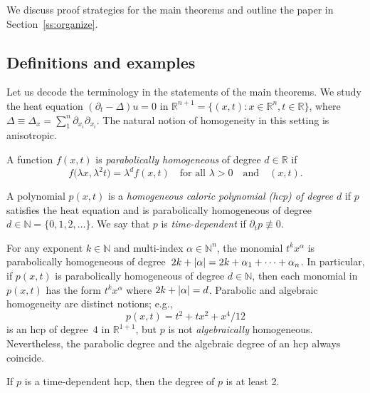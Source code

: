 \documentclass[AHL,Unicode,longabstracts,published]{cedram}
\newcommand{\N}{\mathbb{N}}
\newcommand{\R}{\mathbb{R}}
\newcommand{\abs}[1]{\left \lvert #1 \right \rvert}
\let\originalleft\left
\let\originalright\right
\renewcommand{\left}{\mathopen{}\mathclose\bgroup\originalleft}
\renewcommand{\right}{\aftergroup\egroup\originalright}
\newcommand{\R}{\mathbb{R}}
\begin{document}
We discuss proof strategies for the main theorems and outline the paper in Section~\ref{ss:organize}.

\subsection{Definitions and examples}\label{ss:defs}

Let us decode the terminology in the statements of the main theorems. We study the heat equation $(\partial_t - \Delta) u = 0$ in $\R^{n+1} = \{ (x,t) : x \in \R^n, t \in \R \}$, where $\Delta\equiv \Delta_x=\sum_1^n \partial_{x_i}\partial_{x_i}$. The natural notion of homogeneity in this setting is anisotropic.

\begin{defi}
A function $f(x,t)$ is \emph{parabolically homogeneous} of degree $d \in \R $ if
\begin{equation}
f\bigl(\lambda x, \lambda^2 t\bigr) = \lambda^d f(x,t)\quad\text{for all }\lambda > 0\quad\text{and}\quad(x,t).
\end{equation}
\end{defi}

\begin{defi}
A polynomial $p(x,t)$ is a \emph{homogeneous caloric polynomial (hcp) of degree $d$} if $p$ satisfies the heat equation and is parabolically homogeneous{} of degree $d \in \N=\{0,1,2,\dots\}$. We say that $p$ is \emph{time-dependent} if $\partial_t p \not\equiv 0$.
\end{defi}

\begin{exam}\label{eg:hcp}
For any exponent $k\in \N$ and multi-index $\alpha\in\N^n$, the monomial $t^k x^\alpha$ is parabolically homogeneous{} of degree~$2k + \abs{\alpha}=2k+\alpha_1+\dots+\alpha_n$. In particular, if $p(x,t)$ is parabolically homogeneous{} of degree $d \in \N$, then each monomial in $p(x,t)$ has the form $t^k x^\alpha$ where $2k + \abs{\alpha} = d$. Parabolic and algebraic homogeneity are distinct notions; e.g.,
\begin{equation}
p(x,t)= t^2 +tx^2 + x^4/12
\end{equation}
is an hcp of degree~$4$ in $\R^{1+1}$, but $p$ is not \emph{algebraically} homogeneous. Nevertheless, the parabolic degree and the algebraic degree of an hcp always coincide.
\end{exam}

\begin{rema}
If $p$ is a time-dependent hcp, then the degree of $p$ is at least 2.
\end{rema}
\end{document}
